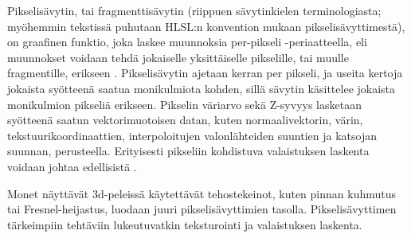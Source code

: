 \documentclass[finnish]{tktltiki2}
\theoremstyle{definition}
\theoremstyle{remark}
\begin{document}
Pikselisävytin, tai fragmenttisävytin (riippuen sävytinkielen terminologiasta; myöhemmin tekstissä puhutaan HLSL:n konvention mukaan pikselisävyttimestä), on graafinen funktio, joka laskee muunnoksia per-pikseli -periaatteella, eli muunnokset voidaan tehdä jokaiselle yksittäiselle pikselille, tai muulle fragmentille, erikseen \cite{}. Pikselisävytin ajetaan kerran per pikseli, ja useita kertoja jokaista syötteenä saatua monikulmiota kohden, sillä sävytin käsittelee jokaista monikulmion pikseliä erikseen. Pikselin väriarvo sekä Z-syvyys lasketaan syötteenä saatun vektorimuotoisen datan, kuten normaalivektorin, värin, tekstuurikoordinaattien, interpoloitujen valonlähteiden suuntien ja katsojan suunnan, perusteella. Erityisesti pikseliin kohdistuva valaistuksen laskenta voidaan johtaa edellisistä \cite{Puh08}.

Monet näyttävät 3d-peleissä käytettävät tehostekeinot, kuten pinnan kuhmutus tai Fresnel-heijastus, luodaan juuri pikselisävyttimien tasolla. Pikselisävyttimen tärkeimpiin tehtäviin lukeutuvatkin teksturointi ja valaistuksen laskenta.




%
%
% 
%

%






% 
\end{document}
